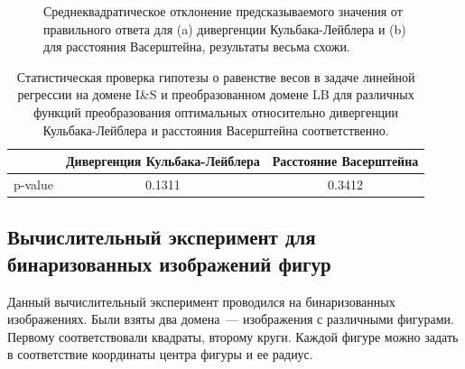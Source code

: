 \documentclass[12pt]{extarticle}
\begin{document}
\begin{figure}[H]
        \centering
        \qquad
        
        \caption{Среднеквадратическое отклонение предсказываемого значения от правильного ответа для (a) дивергенции Кульбака-Лейблера и (b) для расстояния Васерштейна, результаты весьма схожи.}
    \end{figure}

\begin{table}[H]
    \centering
    \begin{tabular}{||c|c|c||}
        \hline 
         & Дивергенция Кульбака-Лейблера & Расстояние Васерштейна \\
        \hline\hline
        p-value & 0.1311 & 0.3412 \\
        \hline
    \end{tabular}
    \caption{Статистическая проверка гипотезы о равенстве весов в задаче линейной регрессии на домене I\&S и преобразованном домене LB для различных функций преобразования оптимальных относительно дивергенции Кульбака-Лейблера и расстояния Васерштейна соответственно.}
    \label{tab:my_label}
\end{table}



\subsection{Вычислительный эксперимент для бинаризованных изображений фигур}

Данный вычислительный эксперимент проводился на бинаризованных изображениях. Были взяты два домена~--- изображения с различными фигурами. Первому соответствовали квадраты, второму круги. Каждой фигуре можно задать в соответствие координаты центра фигуры и ее радиус.
\end{document}
